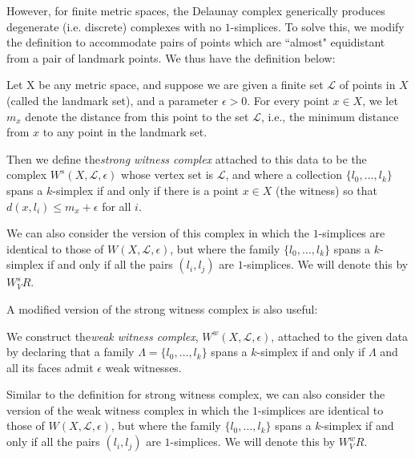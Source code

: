 \documentclass[11pt,reqno,oneside,a4paper]{article}
\begin{document}
However, for finite metric spaces, the Delaunay complex generically produces degenerate (i.e. discrete) complexes with no $1$-simplices. To solve this, we modify the definition to accommodate pairs of points which are ``almost" equidistant from a pair of landmark points. We thus have the definition below: 
\begin{defn}
	Let X be any metric space, and suppose we are given a finite set $\mathcal{L}$ of points in $X$ (called the landmark set), and a parameter $\epsilon> 0$. For every point $x \in X$, we let $m_x$ denote the distance from this point to the set $\mathcal{L}$, i.e., the minimum distance from $x$ to any point in the landmark set.
	
	Then we define the\textit{strong witness complex} attached to this data to be the complex $W^s(X,\mathcal{L}, \epsilon)$ whose vertex set is $\mathcal{L}$, and where a collection $\{l_0, \dots, l_k\}$ spans a $k$-simplex if and only if there is a point $x \in X$ (the witness) so that $d(x, l_i)\leq m_x + \epsilon$ for all $i$. 
	
	We can also consider the version of this complex in which the $1$-simplices are identical to those of $W(X,\mathcal{L},\epsilon)$, but where the family $\{l_0, \dots, l_k\}$ spans a $k$-simplex if and only if all the pairs $(l_i, l_j)$ are $1$-simplices. We will denote this by $W^s_VR$.
\end{defn}

A modified version of the strong witness complex is also useful:

\begin{defn}
	We construct the\textit{weak witness complex}, $W^w(X,\mathcal{L}, \epsilon)$, attached to the given data by declaring that a family $\Lambda = \{l_0, \dots, l_k\}$ spans a $k$-simplex if and only if $\Lambda$ and all its faces admit $\epsilon$ weak witnesses. 
	
	Similar to the definition for strong witness complex, we can also consider the version of the weak witness complex in which the $1$-simplices are identical to those of $W(X,\mathcal{L},\epsilon)$, but where the family $\{l_0, \dots, l_k\}$ spans a $k$-simplex if and only if all the pairs $(l_i, l_j)$ are $1$-simplices. We will denote this by $W^w_VR$.
\end{defn}


{\small}
\end{document}
